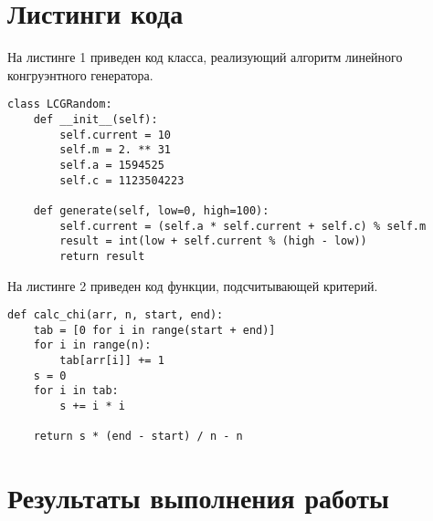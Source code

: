 \section*{Листинги кода}



На листинге 1 приведен код класса, реализующий алгоритм линейного конгруэнтного генератора.
\begin{lstlisting}[label=CodeStand,caption=Линейный конгруэнтный генератор]
class LCGRandom:
	def __init__(self):
		self.current = 10
		self.m = 2. ** 31
		self.a = 1594525
		self.c = 1123504223
	
	def generate(self, low=0, high=100):
		self.current = (self.a * self.current + self.c) % self.m
		result = int(low + self.current % (high - low))
		return result
\end{lstlisting}


На листинге 2 приведен код функции, подсчитывающей критерий.	
\begin{lstlisting}[label=CodeStand,caption=Вычисление критерия <<Хи-квадрат>>]
def calc_chi(arr, n, start, end): 
	tab = [0 for i in range(start + end)]
	for i in range(n):
		tab[arr[i]] += 1
	s = 0
	for i in tab:
		s += i * i
	
	return s * (end - start) / n - n
\end{lstlisting}




\section*{Результаты выполнения работы}

